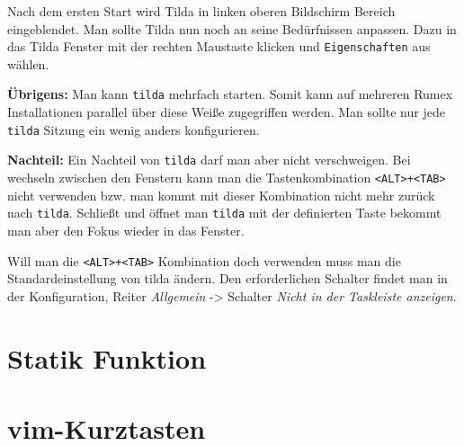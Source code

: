 \documentclass[%
fontsize=12pt,%
parskip=half,%
version=last%
]{scrreprt}
\begin{document}
Nach dem ersten Start wird Tilda in linken oberen Bildschirm Bereich
eingeblendet. Man sollte Tilda nun noch an seine Bedürfnissen anpassen.
Dazu in das Tilda Fenster mit der rechten Maustaste klicken und
\texttt{Eigenschaften} aus wählen.

\textbf{Übrigens:} Man kann \texttt{tilda} mehrfach starten. Somit kann
auf mehreren Rumex Installationen parallel über diese Weiße zugegriffen
werden. Man sollte nur jede \texttt{tilda} Sitzung ein wenig anders
konfigurieren.

\textbf{Nachteil:} Ein Nachteil von \texttt{tilda} darf man aber nicht
verschweigen. Bei wechseln zwischen den Fenstern kann man die
Tastenkombination
\texttt{\textless{}ALT\textgreater{}+\textless{}TAB\textgreater{}} nicht
verwenden bzw. man kommt mit dieser Kombination nicht mehr zurück nach
\texttt{tilda}. Schließt und öffnet man \texttt{tilda} mit der
definierten Taste bekommt man aber den Fokus wieder in das Fenster.

Will man die
\texttt{\textless{}ALT\textgreater{}+\textless{}TAB\textgreater{}}
Kombination doch verwenden muss man die Standardeinstellung von tilda
ändern. Den erforderlichen Schalter findet man in der Konfiguration,
Reiter \emph{Allgemein} -\textgreater{} Schalter \emph{Nicht in der
Taskleiste anzeigen}.



\chapter{Statik Funktion}



\chapter{vim-Kurztasten}


\end{document}
